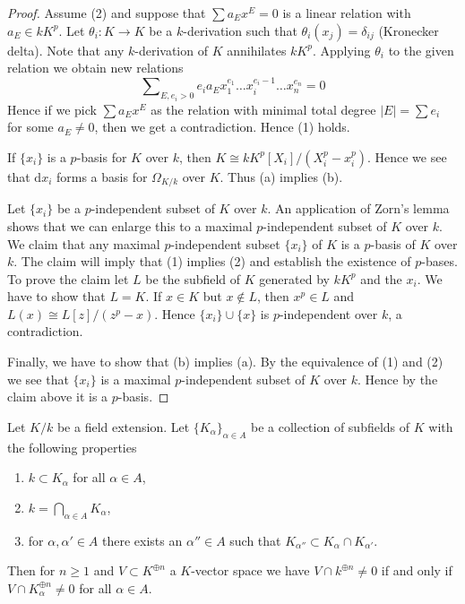 \begin{proof}
Assume (2) and suppose that $\sum a_E x^E = 0$ is a linear relation
with $a_E \in k K^p$. Let $\theta_i : K \to K$ be a $k$-derivation such that
$\theta_i(x_j) = \delta_{ij}$ (Kronecker delta). Note that any $k$-derivation
of $K$ annihilates $kK^p$. Applying $\theta_i$ to the given relation we
obtain new relations
$$
\sum\nolimits_{E, e_i > 0}
e_i a_E x_1^{e_1}\ldots x_i^{e_i - 1} \ldots x_n^{e_n} = 0
$$
Hence if we pick $\sum a_E x^E$ as the relation with minimal
total degree $|E| = \sum e_i$ for some $a_E \not = 0$, then we
get a contradiction. Hence (1) holds.

\medskip\noindent
If $\{x_i\}$ is a $p$-basis for $K$ over $k$, then
$K \cong kK^p[X_i]/(X_i^p - x_i^p)$. Hence we see that
$\text{d}x_i$ forms a basis for $\Omega_{K/k}$ over $K$.
Thus (a) implies (b).

\medskip\noindent
Let $\{x_i\}$ be a $p$-independent subset of $K$ over $k$. An application
of Zorn's lemma shows that we can enlarge this to a maximal $p$-independent
subset of $K$ over $k$. We claim that any maximal $p$-independent subset
$\{x_i\}$ of $K$ is a $p$-basis of $K$ over $k$. The claim will imply
that (1) implies (2) and establish the existence of $p$-bases.
To prove the claim let $L$ be the subfield of $K$ generated by
$kK^p$ and the $x_i$. We have to show that $L = K$. If $x \in K$
but $x \not \in L$, then $x^p \in L$ and $L(x) \cong L[z]/(z^p - x)$.
Hence $\{x_i\} \cup \{x\}$ is $p$-independent over $k$, a contradiction.

\medskip\noindent
Finally, we have to show that (b) implies (a). By the equivalence of (1)
and (2) we see that $\{x_i\}$ is a maximal $p$-independent subset
of $K$ over $k$. Hence by the claim above it is a $p$-basis.
\end{proof}

\begin{lemma}
\label{lemma-intersection-subfields-subspace}
Let $K/k$ be a field extension. Let $\{K_\alpha\}_{\alpha \in A}$
be a collection of subfields of $K$ with the following properties
\begin{enumerate}
\item $k \subset K_\alpha$ for all $\alpha \in A$,
\item $k = \bigcap_{\alpha \in A} K_\alpha$,
\item for $\alpha, \alpha' \in A$ there exists an $\alpha'' \in A$
such that $K_{\alpha''} \subset K_\alpha \cap K_{\alpha'}$.
\end{enumerate}
Then for $n \geq 1$ and $V \subset K^{\oplus n}$ a $K$-vector space
we have $V \cap k^{\oplus n} \not = 0$ if and only if
$V \cap K_\alpha^{\oplus n} \not = 0$ for all $\alpha \in A$.
\end{lemma}

